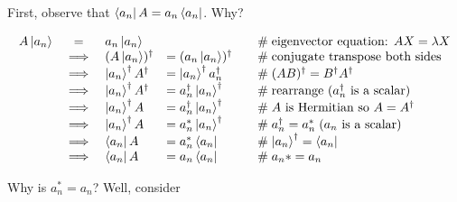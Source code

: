 \documentclass[11pt, oneside]{article}   	%
\begin{document}
\bigskip
\noindent
First, observe that $ \bra{a_n} A = a_n \bra{a_n}$. Why? 

\begin{equation}
\begin{array}{rcllll}
A \ket{a_n}
&=& a_n \ket{a_n}                                                                                                         && \quad \mathrel{\#} \text{eigenvector equation:  $AX = \lambda X$} \\
&\implies& (A \ket{a_n})^{\dagger}               &= (a_n \ket{a_n})^{\dagger}                       & \quad \mathrel{\#} \text{conjugate transpose both sides} \\
&\implies& \ket{a_n}^{\dagger} A^{\dagger} &= \ket{a_n}^{\dagger} a_n^{\dagger}        & \quad \mathrel{\#} (AB)^\dagger = B^\dagger A^\dagger \\
&\implies& \ket{a_n}^{\dagger} A^{\dagger} &= a_n^{\dagger} \ket{a_n}^{\dagger}        & \quad \mathrel{\#} \text{rearrange ($a_n^\dagger$ is a scalar)} \\
&\implies& \ket{a_n}^{\dagger} A                 &= a_n^{\dagger} \ket{a_n}^{\dagger}         & \quad \mathrel{\#} \text{$A$ is Hermitian so $A = A^\dagger$} \\
&\implies& \ket{a_n}^{\dagger} A                 & = a_n^{*} \ket{a_n}^{\dagger}                   & \quad \mathrel{\#} a_n^{\dagger} = a_n^* \; \text{($a_n$ is a scalar)} \\
&\implies& \bra{a_n} A                                 &= a_n^{*} \bra{a_n}                                    & \quad \mathrel{\#} \ket{a_n}^{\dagger} = \bra{a_n} \\
&\implies& \bra{a_n} A                                 &= a_n  \bra{a_n}                                         & \quad \mathrel{\#} a_n* = a_n
\label{eqn:aketan}
\end{array}
\end{equation}

\bigskip
\noindent
Why is $a_n^* = a_n$? Well, consider
\end{document}
